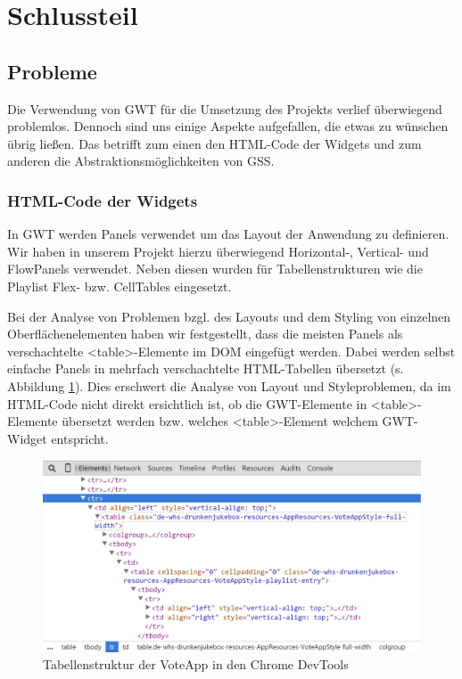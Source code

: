 \section{Schlussteil}

\subsection{Probleme}

Die Verwendung von GWT für die Umsetzung des Projekts verlief überwiegend problemlos. Dennoch sind uns einige Aspekte aufgefallen, die etwas zu wünschen übrig ließen. Das betrifft zum einen den HTML-Code der Widgets und zum anderen die Abstraktionsmöglichkeiten von GSS.

\subsubsection{HTML-Code der Widgets}

In GWT werden Panels verwendet um das Layout der Anwendung zu definieren. Wir haben in unserem Projekt
hierzu überwiegend Horizontal-, Vertical- und FlowPanels verwendet. Neben diesen wurden für Tabellenstrukturen wie die Playlist
Flex- bzw. CellTables eingesetzt.

Bei der Analyse von Problemen bzgl. des Layouts und dem Styling von einzelnen Oberflächenelementen haben wir
festgestellt, dass die meisten Panels als verschachtelte <table>-Elemente im DOM eingefügt werden.
Dabei werden selbst einfache Panels in mehrfach verschachtelte HTML-Tabellen übersetzt (s. Abbildung \ref{fig:Probleme-HTML-tables}). Dies erschwert die Analyse von Layout und Styleproblemen, da im HTML-Code nicht direkt ersichtlich ist, ob die GWT-Elemente in <table>-Elemente übersetzt werden bzw. welches <table>-Element welchem GWT-Widget entspricht. 

\begin{figure}[htb]
\centering
\includegraphics[width=1.0\linewidth]{Bilder/Probleme-HTML-tables}
\caption{Tabellenstruktur der VoteApp in den Chrome DevTools}
\label{fig:Probleme-HTML-tables}
\end{figure}

